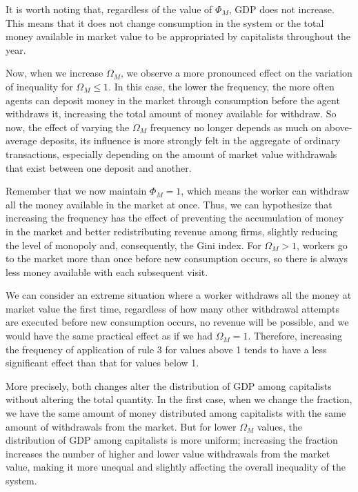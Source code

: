 It is worth noting that, regardless of the value of $\Phi_{M}$, GDP does not increase. This means that it does not change consumption in the system or the total money available in market value to be appropriated by capitalists throughout the year.

Now, when we increase $\Omega_{M}$, we observe a more pronounced effect on the variation of inequality for $\Omega_{M}\leq1$. In this case, the lower the frequency, the more often agents can deposit money in the market through consumption before the agent withdraws it, increasing the total amount of money available for withdraw. So now, the effect of varying the $\Omega_{M}$ frequency no longer depends as much on above-average deposits, its influence is more strongly felt in the aggregate of ordinary transactions, especially depending on the amount of market value withdrawals that exist between one deposit and another.

Remember that we now maintain $\Phi_{M}=1$, which means the worker can withdraw all the money available in the market at once. Thus, we can hypothesize that increasing the frequency has the effect of preventing the accumulation of money in the market and better redistributing revenue among firms, slightly reducing the level of monopoly and, consequently, the Gini index. For $\Omega_{M}>1$, workers go to the market more than once before new consumption occurs, so there is always less money available with each subsequent visit.

We can consider an extreme situation where a worker withdraws all the money at market value the first time, regardless of how many other withdrawal attempts are executed before new consumption occurs, no revenue will be possible, and we would have the same practical effect as if we had $\Omega_{M}=1$. Therefore, increasing the frequency of application of rule 3 for values above 1 tends to have a less significant effect than that for values below 1.

More precisely, both changes alter the distribution of GDP among capitalists without altering the total quantity. In the first case, when we change the fraction, we have the same amount of money distributed among capitalists with the same amount of withdrawals from the market. But for lower $\Omega_{M}$ values, the distribution of GDP among capitalists is more uniform; increasing the fraction increases the number of higher and lower value withdrawals from the market value, making it more unequal and slightly affecting the overall inequality of the system.

